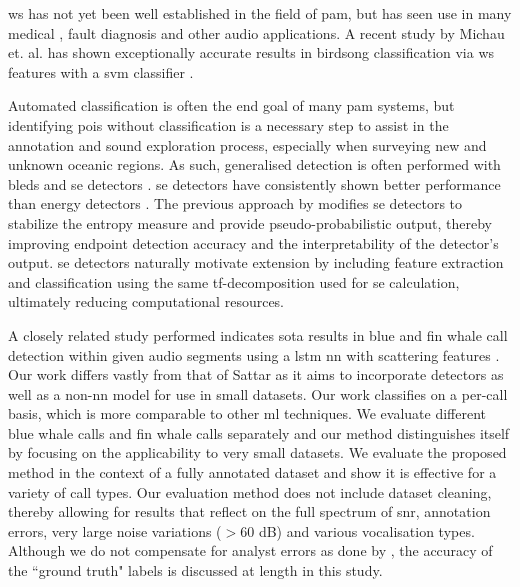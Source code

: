 \Ac{ws} has not yet been well established in the field of \ac{pam}, but has seen use in many medical \citep{ws_ecg, ecg_ws_svm}, fault diagnosis \citep{ws_fault_diag} and other audio \citep{ws_speech, ws_audio2, ws_audio} applications. A recent study by Michau et. al. has shown exceptionally accurate results in birdsong classification via \ac{ws} features with a \ac{svm} classifier \citep{scattering_birdsong}.

Automated classification is often the end goal of many \ac{pam} systems, but identifying \acp{poi} without classification is a necessary step to assist in the annotation and sound exploration process, especially when surveying new and unknown oceanic regions. As such, generalised detection is often performed with \acp{bled} and \ac{se} detectors \citep{entropyOCEANS}. \Ac{se} detectors have consistently shown better performance than energy detectors \citep{entropyJASA}. The previous approach by \citet{mypaper} modifies \ac{se} detectors to stabilize the entropy measure and provide pseudo-probabilistic output, thereby improving endpoint detection accuracy and the interpretability of the detector's output. \ac{se} detectors naturally motivate extension by including feature extraction and classification using the same \ac{tf}-decomposition used for \ac{se} calculation, ultimately reducing computational resources.

A closely related study performed indicates \ac{sota} results in blue and fin whale call detection within given audio segments using a \ac{lstm} \ac{nn} with scattering features \citep{otherScattering}. Our work differs vastly from that of Sattar as it aims to incorporate detectors as well as a non-\ac{nn} model for use in small datasets. Our work classifies on a per-call basis, which is more comparable to other \ac{ml} techniques. We evaluate different blue whale calls and fin whale calls separately and our method distinguishes itself by focusing on the applicability to very small datasets. We evaluate the proposed method in the context of a fully annotated dataset and show it is effective for a variety of call types. Our evaluation method does not include dataset cleaning, thereby allowing for results that reflect on the full spectrum of \ac{snr}, annotation errors, very large noise variations ($>60$ dB) and various vocalisation types. Although we do not compensate for analyst errors as done by \citet{casey2019}, the accuracy of the ``ground truth" labels is discussed at length in this study.

